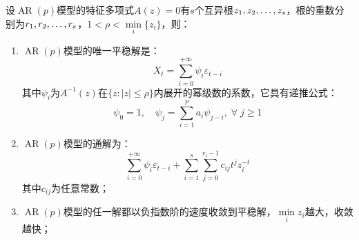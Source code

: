 \begin{theorem}\label{theo:ARPSolution}
	设$\operatorname{AR}(p)$模型的特征多项式$A(z)=0$有$s$个互异根$z_1, z_2, \dots, z_{s}$，根的重数分别为$r_1, r_2, \dots, r_{s}$，$1<\rho<\min\limits_i\{z_i\}$，则：
	\begin{enumerate}
		\item $\operatorname{AR}(p)$模型的唯一平稳解是：
		\begin{equation*}
			X_t=\sum_{i=0}^{+\infty}\psi_i\varepsilon_{t-i}
		\end{equation*}
		其中$\psi_i$为$A^{-1}(z)$在$\{z:|z|\leqslant\rho\}$内展开的幂级数的系数，它具有递推公式：
		\begin{equation*}
			\psi_0=1,\quad\psi_j=\sum_{i=1}^{p}a_i\psi_{j-i},\;\forall\;j\geqslant1
		\end{equation*}
		\item $\operatorname{AR}(p)$模型的通解为：
		\begin{equation*}
			\sum_{i=0}^{+\infty}\psi_i\varepsilon_{t-i}+\sum_{i=1}^{s}\sum_{j=0}^{r_i-1}c_{ij}t^{j}z_i^{-t}
		\end{equation*}
		其中$c_{ij}$为任意常数；
		\item $\operatorname{AR}(p)$模型的任一解都以负指数阶的速度收敛到平稳解，$\min\limits_i{z_i}$越大，收敛越快；
	\end{enumerate}
\end{theorem}
